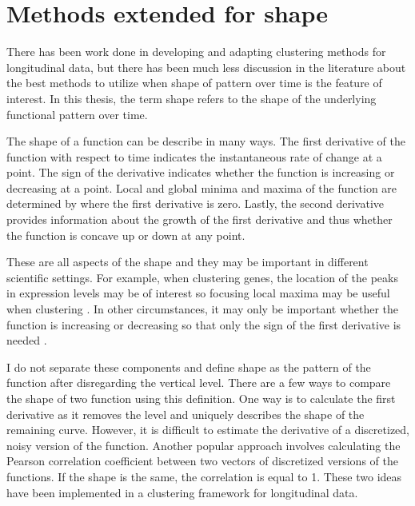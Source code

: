 \section{Methods extended for shape}
There has been work done in developing and adapting clustering methods for longitudinal data, but there has been much less discussion in the literature about the best methods to utilize when shape of pattern over time is the feature of interest. In this thesis, the term shape refers to the shape of the underlying functional pattern over time.

The shape of a function can be describe in many ways. The first derivative of the function with respect to time indicates the instantaneous rate of change at a point. The sign of the derivative indicates whether the function is increasing or decreasing at a point.  Local and global minima and maxima of the function are determined by where the first derivative is zero. Lastly, the second derivative provides information about the growth of the first derivative and thus whether the function is concave up or down at any point. 

These are all aspects of the shape and they may be important in different scientific settings. For example, when clustering genes, the location of the peaks in expression levels may be of interest so focusing local maxima may be useful when clustering \cite{luan2003}. In other circumstances, it may only be important whether the function is increasing or decreasing so that only the sign of the first derivative is needed \cite{phang2003}. 

I do not separate these components and define shape as the pattern of the function after disregarding the vertical level. There are a few ways to compare the shape of two function using this definition. One way is to calculate the first derivative as it removes the level and uniquely describes the shape of the remaining curve. However, it is difficult to estimate the derivative of a discretized, noisy version of the function. Another popular approach involves calculating the Pearson correlation coefficient between two vectors of discretized versions of the functions. If the shape is the same, the correlation is equal to 1. These two ideas have been implemented in a clustering framework for longitudinal data.

